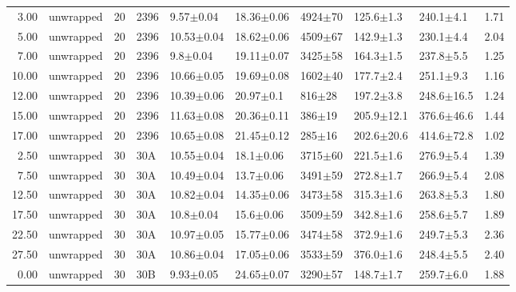 \begin{tabular}{rlrllllllr}
      3.00 &     unwrapped &      20 &    2396 &        9.57$\pm$0.04 &   18.36$\pm$0.06 &  4924$\pm$70 &   125.6$\pm$1.3 &   240.1$\pm$4.1 &        1.71 \\
      5.00 &     unwrapped &      20 &    2396 &       10.53$\pm$0.04 &   18.62$\pm$0.06 &  4509$\pm$67 &   142.9$\pm$1.3 &   230.1$\pm$4.4 &        2.04 \\
      7.00 &     unwrapped &      20 &    2396 &         9.8$\pm$0.04 &   19.11$\pm$0.07 &  3425$\pm$58 &   164.3$\pm$1.5 &   237.8$\pm$5.5 &        1.25 \\
     10.00 &     unwrapped &      20 &    2396 &       10.66$\pm$0.05 &   19.69$\pm$0.08 &  1602$\pm$40 &   177.7$\pm$2.4 &   251.1$\pm$9.3 &        1.16 \\
     12.00 &     unwrapped &      20 &    2396 &       10.39$\pm$0.06 &    20.97$\pm$0.1 &   816$\pm$28 &   197.2$\pm$3.8 &  248.6$\pm$16.5 &        1.24 \\
     15.00 &     unwrapped &      20 &    2396 &       11.63$\pm$0.08 &   20.36$\pm$0.11 &   386$\pm$19 &  205.9$\pm$12.1 &  376.6$\pm$46.6 &        1.44 \\
     17.00 &     unwrapped &      20 &    2396 &       10.65$\pm$0.08 &   21.45$\pm$0.12 &   285$\pm$16 &  202.6$\pm$20.6 &  414.6$\pm$72.8 &        1.02 \\
      2.50 &     unwrapped &      30 &     30A &       10.55$\pm$0.04 &    18.1$\pm$0.06 &  3715$\pm$60 &   221.5$\pm$1.6 &   276.9$\pm$5.4 &        1.39 \\
      7.50 &     unwrapped &      30 &     30A &       10.49$\pm$0.04 &    13.7$\pm$0.06 &  3491$\pm$59 &   272.8$\pm$1.7 &   266.9$\pm$5.4 &        2.08 \\
     12.50 &     unwrapped &      30 &     30A &       10.82$\pm$0.04 &   14.35$\pm$0.06 &  3473$\pm$58 &   315.3$\pm$1.6 &   263.8$\pm$5.3 &        1.80 \\
     17.50 &     unwrapped &      30 &     30A &        10.8$\pm$0.04 &    15.6$\pm$0.06 &  3509$\pm$59 &   342.8$\pm$1.6 &   258.6$\pm$5.7 &        1.89 \\
     22.50 &     unwrapped &      30 &     30A &       10.97$\pm$0.05 &   15.77$\pm$0.06 &  3474$\pm$58 &   372.9$\pm$1.6 &   249.7$\pm$5.3 &        2.36 \\
     27.50 &     unwrapped &      30 &     30A &       10.86$\pm$0.04 &   17.05$\pm$0.06 &  3533$\pm$59 &   376.0$\pm$1.6 &   248.4$\pm$5.5 &        2.40 \\
      0.00 &     unwrapped &      30 &     30B &        9.93$\pm$0.05 &   24.65$\pm$0.07 &  3290$\pm$57 &   148.7$\pm$1.7 &   259.7$\pm$6.0 &        1.88 \\

\end{tabular}
